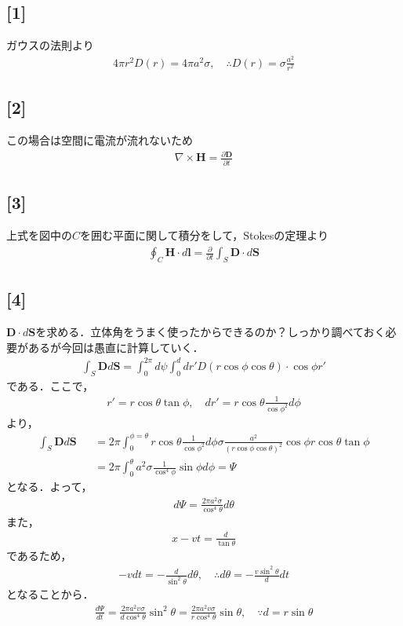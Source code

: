 \documentclass[12pt,dvipdfmx]{jsarticle}
\begin{document}
\subsection*{\large{[1]}}
ガウスの法則より
\begin{eqnarray}
  4\pi r^2 D(r) = 4\pi a^2 \sigma ,\quad\therefore D(r) = \sigma\frac{a^2}{r^2}
\end{eqnarray}
\subsection*{\large{[2]}}
この場合は空間に電流が流れないため
\begin{eqnarray}
  \nabla\times \bm{H} = \frac{\partial\bm{D}}{\partial t}
\end{eqnarray}
\subsection*{\large{[3]}}
上式を図中の$C$を囲む平面に関して積分をして，Stokesの定理より
\begin{eqnarray}
  \oint_C \bm{H}\cdot d\bm{l} = \frac{\partial}{\partial t} \int_S \bm{D}\cdot d\bm{S}
\end{eqnarray}
\subsection*{\large{[4]}}
$\bm{D}\cdot d\bm{S}$を求める．立体角をうまく使ったからできるのか？しっかり調べておく必要があるが今回は愚直に計算していく．
\begin{eqnarray}
  \int_S \bm{D}d\bm{S} = \int_0^{2\pi}d\psi \int_{0}^{d}dr' D(r\cos\phi\cos\theta)\cdot \cos\phi r'
\end{eqnarray}
である．ここで，
\begin{eqnarray}
  r' = r\cos\theta \tan\phi,\quad dr' = r\cos\theta \frac{1}{\cos\phi^2}d\phi
\end{eqnarray}
より，
\begin{eqnarray}
  \int_S \bm{D}d\bm{S} &&= 2\pi \int_{0}^{\phi=\theta}  r\cos\theta \frac{1}{\cos\phi^2}d\phi \sigma\frac{a^2}{(r\cos\phi\cos\theta)^2} \cos\phi  r\cos\theta \tan\phi\\
  &&=2\pi\int_0^{\theta} a^2\sigma \frac{1}{\cos^4\phi}\sin\phi d\phi  = \Psi
\end{eqnarray}
となる．よって，
\begin{eqnarray}
  d\Psi = \frac{2\pi a^2\sigma}{\cos^4\theta}d\theta
\end{eqnarray}
また，
\begin{eqnarray}
  x-vt = \frac{d}{\tan\theta}
\end{eqnarray}
であるため，
\begin{eqnarray}
  -vdt = -\frac{d}{\sin^2\theta}d\theta,\quad\therefore d\theta = -\frac{v\sin^2\theta}{d}dt
\end{eqnarray}
となることから．
\begin{eqnarray}
  \frac{d\Psi}{d t} = \frac{2\pi a^2 v\sigma}{d\cos^4\theta}\sin^2\theta = \frac{2\pi a^2 v\sigma}{r\cos^4\theta}\sin\theta, \quad\because d = r\sin\theta
\end{eqnarray}
\end{document}
